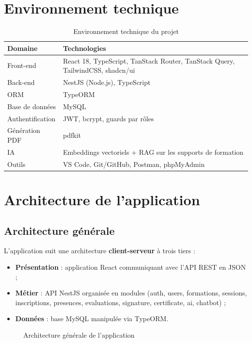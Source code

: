 \documentclass[12pt,a4paper]{report}
\begin{document}
\section{Environnement technique}
\begin{table}[H]
\centering
\begin{tabular}{p{3cm} p{10cm}}
\toprule
\textbf{Domaine} & \textbf{Technologies} \\
\midrule
Front-end & React 18, TypeScript, TanStack Router, TanStack Query,
TailwindCSS, shadcn/ui \\
Back-end & NestJS (Node.js), TypeScript \\
ORM & TypeORM \\
Base de données & MySQL \\
Authentification & JWT, bcrypt, guards par rôles \\
Génération PDF & pdfkit \\
IA & Embeddings vectoriels + RAG sur les supports de formation \\
Outils & VS Code, Git/GitHub, Postman, phpMyAdmin \\
\bottomrule
\end{tabular}
\caption{Environnement technique du projet}
\end{table}

\section{Architecture de l'application}
\subsection{Architecture générale}
L'application suit une architecture \textbf{client-serveur} à trois tiers :
\begin{itemize}
  \item \textbf{Présentation} : application React communiquant avec l'API
    REST en JSON ;
  \item \textbf{Métier} : API NestJS organisée en modules
    (auth, users, formations, sessions, inscriptions, presences,
    evaluations, signature, certificate, ai, chatbot) ;
  \item \textbf{Données} : base MySQL manipulée via TypeORM.
\end{itemize}

\begin{figure}[H]
\centering
{}
\caption{Architecture générale de l'application}
\end{figure}
\end{document}
